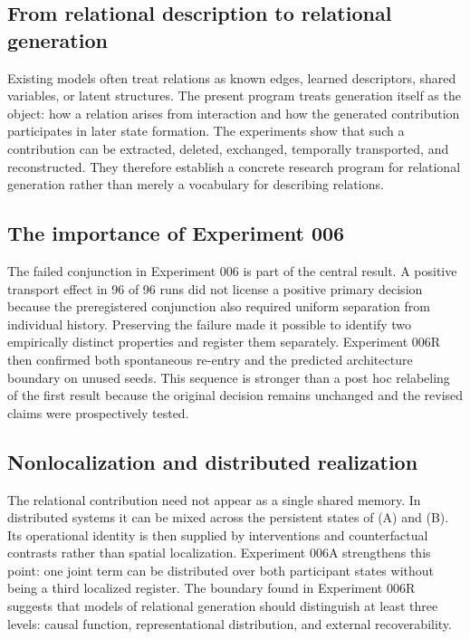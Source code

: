 \documentclass[11pt,a4paper]{article}
\begin{document}
\subsection{From relational description to relational generation}

Existing models often treat relations as known edges, learned descriptors, shared variables, or latent structures. The present program treats generation itself as the object: how a relation arises from interaction and how the generated contribution participates in later state formation. The experiments show that such a contribution can be extracted, deleted, exchanged, temporally transported, and reconstructed. They therefore establish a concrete research program for relational generation rather than merely a vocabulary for describing relations.

\subsection{The importance of Experiment 006}

The failed conjunction in Experiment 006 is part of the central result. A positive transport effect in 96 of 96 runs did not license a positive primary decision because the preregistered conjunction also required uniform separation from individual history. Preserving the failure made it possible to identify two empirically distinct properties and register them separately. Experiment 006R then confirmed both spontaneous re-entry and the predicted architecture boundary on unused seeds. This sequence is stronger than a post hoc relabeling of the first result because the original decision remains unchanged and the revised claims were prospectively tested.

\subsection{Nonlocalization and distributed realization}

The relational contribution need not appear as a single shared memory. In distributed systems it can be mixed across the persistent states of (A) and (B). Its operational identity is then supplied by interventions and counterfactual contrasts rather than spatial localization. Experiment 006A strengthens this point: one joint term can be distributed over both participant states without being a third localized register. The boundary found in Experiment 006R suggests that models of relational generation should distinguish at least three levels: causal function, representational distribution, and external recoverability.
\end{document}
